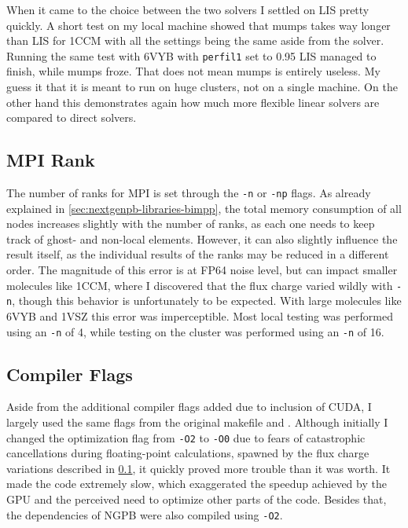When it came to the choice between the two solvers I settled on LIS pretty quickly.
A short test on my local machine showed that mumps takes way longer than LIS for 1CCM with all the settings being the same aside from the solver.
Running the same test with 6VYB with \texttt{perfil1} set to 0.95 LIS managed to finish, while mumps froze.
That does not mean mumps is entirely useless. My guess it that it is meant to run on huge clusters, not on a single machine.
On the other hand this demonstrates again how much more flexible linear solvers are compared to direct solvers.

\subsection{MPI Rank}
\label{sec:evaluation-experimental-setup-mpi-ranks}

The number of ranks for MPI is set through the \texttt{-n} or \texttt{-np} flags. 
As already explained in \ref{sec:nextgenpb-libraries-bimpp}, the total memory consumption of all nodes increases slightly with the number of ranks, as each one needs to keep track of ghost- and non-local elements.
However, it can also slightly influence the result itself, as the individual results of the ranks may be reduced in a different order.
The magnitude of this error is at FP64 noise level, but can impact smaller molecules like 1CCM, where I discovered that the flux charge varied wildly with \texttt{-n}, though this behavior is unfortunately to be expected.
With large molecules like 6VYB and 1VSZ this error was imperceptible.
Most local testing was performed using an \texttt{-n} of 4, while testing on the cluster was performed using an \texttt{-n} of 16.

\subsection{Compiler Flags}
\label{sec:evaluation-experimental-setup-compiler-flags}

Aside from the additional compiler flags added due to inclusion of CUDA, I largely used the same flags from the original makefile and . 
Although initially I changed the optimization flag from \texttt{-O2} to \texttt{-O0} due to fears of catastrophic cancellations during floating-point calculations, spawned by the flux charge variations described in \ref{sec:evaluation-experimental-setup-mpi-ranks}, it quickly proved more trouble than it was worth. 
It made the code extremely slow, which exaggerated the speedup achieved by the GPU and the perceived need to optimize other parts of the code. 
Besides that, the dependencies of NGPB were also compiled using \texttt{-O2}. 


